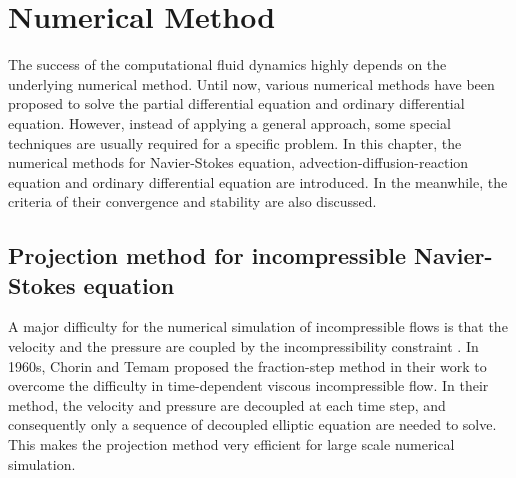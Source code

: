 \chapter{Numerical Method}
The success of the computational fluid dynamics highly depends on the underlying numerical method. Until now, various numerical methods have been proposed to solve the partial differential equation and ordinary differential equation. However, instead of applying a general approach, some special techniques are usually required for a specific problem. In this chapter, the numerical methods for Navier-Stokes equation, advection-diffusion-reaction equation and ordinary differential equation are introduced. In the meanwhile, the criteria of their convergence and stability are also discussed.

\section{Projection method for incompressible Navier-Stokes equation}
A major difficulty for the numerical simulation of incompressible flows is that the velocity and the pressure are coupled by the incompressibility constraint \cite{Guermond2006Overview}. In 1960s, Chorin and Temam proposed the fraction-step method in their work \cite{Temam1969approximation, Chorin1968Numerical} to overcome the difficulty in time-dependent viscous incompressible flow. In their method, the velocity and pressure are decoupled at each time step, and consequently only a sequence of decoupled elliptic equation are needed to solve. This makes the projection method very efficient for large scale numerical simulation.

